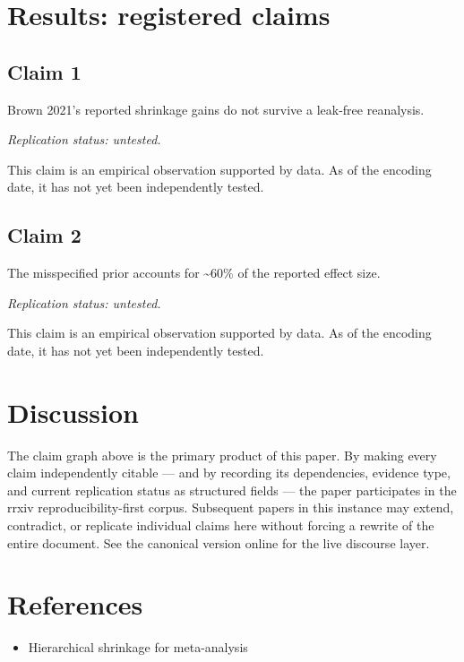\documentclass{rrxiv}
\begin{document}
\section{Results: registered claims}
\subsection*{Claim 1}
\begin{claim}[Claim 1]
\label{claim:c1}
Brown 2021's reported shrinkage gains do not survive a leak-free reanalysis.

\emph{Replication status: untested.}
\end{claim}
This claim is an empirical observation supported by data. As of the encoding date, it has not yet been independently tested.

\subsection*{Claim 2}
\begin{claim}[Claim 2]
\label{claim:c2}
The misspecified prior accounts for \textasciitilde{}60\% of the reported effect size.

\emph{Replication status: untested.}
\end{claim}
This claim is an empirical observation supported by data. As of the encoding date, it has not yet been independently tested.

\section{Discussion}
The claim graph above is the primary product of this paper. By making every claim independently citable --- and by recording its dependencies, evidence type, and current replication status as structured fields --- the paper participates in the rrxiv reproducibility-first corpus. Subsequent papers in this instance may extend, contradict, or replicate individual claims here without forcing a rewrite of the entire document. See the canonical version online for the live discourse layer.

\section{References}
\begin{itemize}[leftmargin=*]
\item Hierarchical shrinkage for meta-analysis
\end{itemize}
\end{document}
